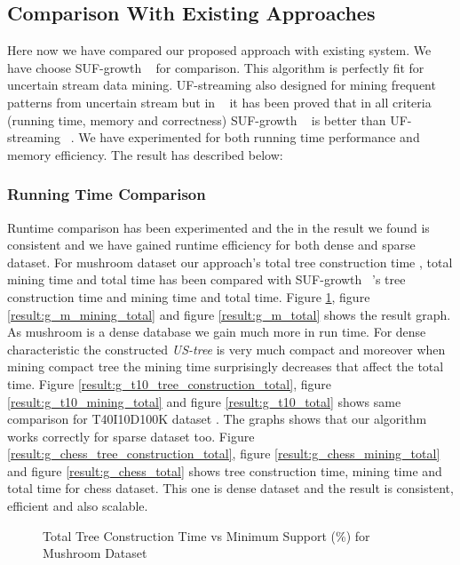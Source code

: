 \subsection{Comparison With Existing Approaches}
Here now we have compared our proposed approach with existing system. We have choose SUF-growth ~\cite{suf_growth}  for comparison. This algorithm is perfectly fit for uncertain stream data mining. UF-streaming also designed for mining frequent patterns from uncertain stream but in ~\cite{suf_growth} it has been proved that in all criteria (running time, memory and correctness) SUF-growth ~\cite{suf_growth} is better than UF-streaming ~\cite{suf_growth}. We have experimented for both running time performance and memory efficiency. The result has described below:
    \subsubsection{Running Time Comparison}
    Runtime comparison has been experimented and the in the result we found is consistent and we have gained runtime efficiency for both dense and sparse dataset. For mushroom dataset our approach's total tree construction time , total mining time and total time has been compared with SUF-growth ~\cite{suf_growth}'s tree construction time and mining time and total time. Figure \ref{result:g_m_tree_construction_total}, figure \ref{result:g_m_mining_total} and figure \ref{result:g_m_total} shows the result graph. As mushroom is a dense database we gain much more in run time. For dense characteristic the constructed \emph{US-tree} is very much compact and moreover when mining compact tree the mining time surprisingly decreases that affect the total time. Figure \ref{result:g_t10_tree_construction_total}, figure \ref{result:g_t10_mining_total} and figure \ref{result:g_t10_total} shows same comparison for T40I10D100K dataset . The graphs shows that our algorithm works correctly for sparse dataset too. Figure \ref{result:g_chess_tree_construction_total}, figure \ref{result:g_chess_mining_total} and figure \ref{result:g_chess_total} shows tree construction time, mining time and total time for chess dataset. This one is dense dataset and the result is consistent, efficient and also scalable.
            \begin{figure}[h]
            \centering
                
            \caption{Total Tree Construction Time vs Minimum Support (\%) for Mushroom Dataset }
            \label{result:g_m_tree_construction_total}
            \end{figure}
            
